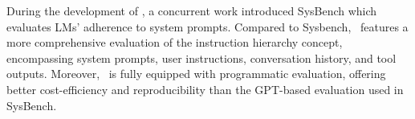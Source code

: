 During the development of \benchmark , a concurrent work \citep{sysbench} introduced SysBench which evaluates LMs' adherence to system prompts. Compared to Sysbench, \benchmark\ features a more comprehensive evaluation of the instruction hierarchy concept, encompassing system prompts, user instructions, conversation history, and tool outputs. Moreover, \benchmark\ is fully equipped with programmatic evaluation, offering better cost-efficiency and reproducibility than the GPT-based evaluation used in SysBench.
